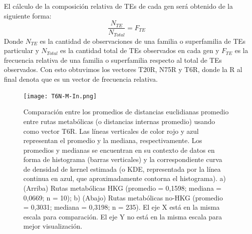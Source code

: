 \documentclass[12pt]{article}
\begin{document}
\newpage
El cálculo de la composición relativa de TEs de cada gen será obtenido de la siguiente forma:
\begin{equation}
    \frac{N_{TE}}{N_{Total}} = F_{TE}
    \label{eq:freqRelativa}
\end{equation}
Donde $N_{TE}$ es la cantidad de observaciones de una familia o superfamilia de TEs particular y $N_{Total}$ es la cantidad total de TEs observados en cada gen y $F_{TE}$ es la frecuencia relativa de una familia o superfamilia respecto al total de TEs observados. Con esto obtuvimos los vectores T20R, N75R y T6R, donde la R al final denota que es un vector de frecuencia relativa.

\begin{figure}[ht!]
    \centering
    \small
    \vspace*{-10mm}
    \texttt{[image: T6N-M-In.png]}
    \caption{Comparación entre los promedios de distancias euclidianas promedio entre rutas metabólicas (o distancias internas promedio) usando como vector T6R. Las líneas verticales de color rojo y azul representan el promedio y la mediana, respectivamente. Los promedios y medianas se encuentran en su contexto de datos en forma de histograma (barras verticales) y la correspondiente curva de densidad de kernel estimada (o KDE, representada por la línea continua en azul, que aproximadamente contorna el histograma). a) (Arriba) Rutas metabólicas HKG (promedio = 0,1598; mediana = 0,0669; n = 10); b) (Abajo) Rutas metabólicas no-HKG (promedio = 0,3031; mediana = 0,3198; n = 235). El eje X está en la misma escala para comparación. El eje Y no está en la misma escala para mejor visualización.}
    \label{T6R-M-In}
\end{figure}
\end{document}
